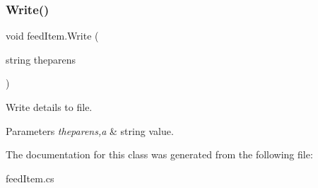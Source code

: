 \subsubsection{\texorpdfstring{Write()}{Write()}}
{\footnotesize\ttfamily void feed\+Item.\+Write (\begin{DoxyParamCaption}\item[{string}]{theparens }\end{DoxyParamCaption})\hspace{0.3cm}{\ttfamily [inline]}}



Write details to file. 


\begin{DoxyParams}{Parameters}
{\em theparens,a} & string value. \\
\hline
\end{DoxyParams}


The documentation for this class was generated from the following file\+:\begin{DoxyCompactItemize}
\item 
feed\+Item.\+cs\end{DoxyCompactItemize}
